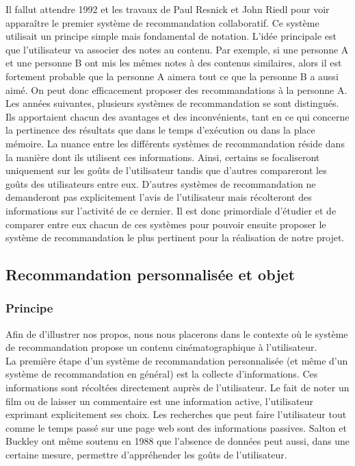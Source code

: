 \documentclass{article}
\begin{document}
Il fallut attendre 1992 et les travaux de  Paul Resnick et John Riedl pour voir apparaître le premier système de recommandation collaboratif. Ce système utilisait un principe simple mais fondamental de notation. L'idée principale est que l'utilisateur va associer des notes au contenu. Par exemple, si une personne A et une personne B ont mis les mêmes notes à des contenus similaires, alors il est fortement probable que la personne A aimera tout ce que la personne B a aussi aimé. On peut donc efficacement proposer des recommandations à la personne A.\\

Les années suivantes, plusieurs systèmes de recommandation se sont distingués. Ils apportaient chacun des avantages et des inconvénients, tant en ce qui concerne la pertinence des résultats que dans le temps d’exécution ou dans la place mémoire. La nuance entre les différents systèmes de recommandation réside dans la manière dont ils utilisent ces informations. Ainsi, certains se focaliseront uniquement sur les goûts de l'utilisateur tandis que d'autres compareront les goûts des utilisateurs entre eux. D'autres systèmes de recommandation ne demanderont pas explicitement l'avis de l'utilisateur mais récolteront des informations sur l'activité de ce dernier. Il est donc primordiale d'étudier et de comparer entre eux chacun de ces systèmes pour pouvoir ensuite proposer le système de recommandation le plus pertinent pour la réalisation de notre projet.

\subsection{Recommandation personnalisée et objet}
\subsubsection{Principe}

Afin de d'illustrer nos propos, nous nous placerons dans le contexte où le système de recommandation propose un contenu cinématographique à l'utilisateur.\\

La première étape d'un système de recommandation personnalisée (et même d’un système de recommandation en général) est la collecte d'informations. Ces informations sont récoltées directement auprès de l'utilisateur. Le fait de noter un film ou de laisser un commentaire est une information active, l'utilisateur exprimant explicitement ses choix. Les recherches que peut faire l'utilisateur tout comme le temps passé sur une page web sont des informations passives. Salton et Buckley ont même  soutenu en 1988 que l’absence de données peut aussi, dans une certaine mesure, permettre d'appréhender les goûts de l'utilisateur.
\end{document}
